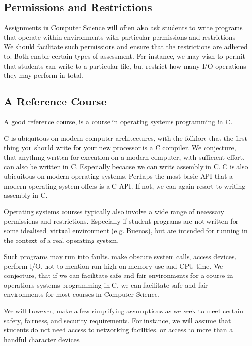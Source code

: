 \subsection{Permissions and Restrictions}

Assignments in Computer Science will often also ask students to write programs
that operate within environments with particular permissions and restrictions.
We should facilitate such permissions and ensure that the restrictions are
adhered to. Both enable certain types of assessment. For instance, we may wish
to permit that students can write to a particular file, but restrict how many
I/O operations they may perform in total.

\subsection{A Reference Course}

A good reference course, is a course in operating systems programming in C.

C is ubiquitous on modern computer architectures, with the folklore that the
first thing you should write for your new processor is a C compiler. We
conjecture, that anything written for execution on a modern computer, with
sufficient effort, can also be written in C. Especially because we can write
assembly in C. C is also ubiquitous on modern operating systems. Perhaps the
most basic API that a modern operating system offers is a C API. If not, we can
again resort to writing assembly in C.

Operating systems courses typically also involve a wide range of necessary
permissions and restrictions. Especially if student programs are not written
for some idealised, virtual environment (e.g. Buenos), but are intended for
running in the context of a real operating system.

Such programs may run into faults, make obscure system calls, access devices,
perform I/O, not to mention run high on memory use and CPU time. We conjecture,
that if we can facilitate safe and fair environments for a course in operations
systems programming in C, we can facilitate safe and fair environments for most
courses in Computer Science.

We will however, make a few simplifying assumptions as we seek to meet certain
safety, fairness, and security requirements. For instance, we will assume that
students do not need access to networking facilities, or access to more than a
handful character devices.
